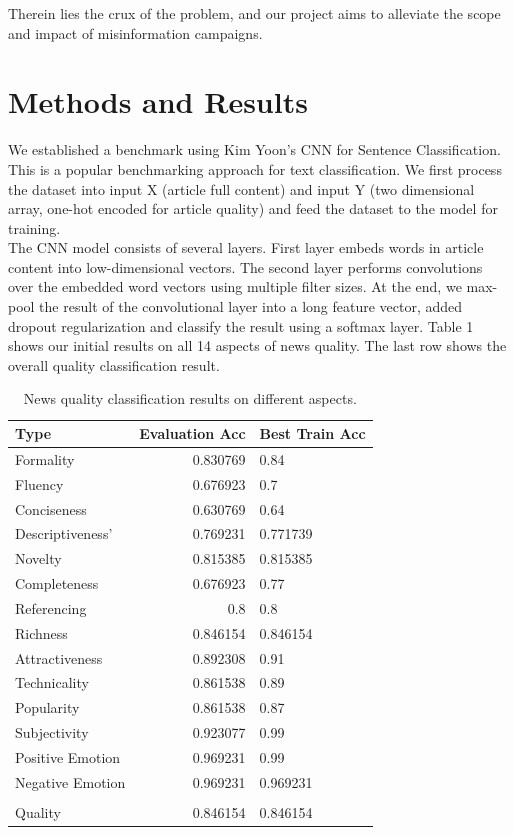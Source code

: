 \documentclass[11pt]{article}
\begin{document}
\indent Therein lies the crux of the problem, and our project aims to alleviate the scope and impact of misinformation campaigns.

\section{Methods and Results}

\indent \indent We established a benchmark using Kim Yoon’s CNN for Sentence Classification. This is a popular benchmarking approach for text classification. We first process the dataset into input X (article full content) and input Y (two dimensional array, one-hot encoded for article quality) and feed the dataset to the model for training. \\
\indent The CNN model consists of several layers. First layer embeds words in article content into low-dimensional vectors. The second layer performs convolutions over the embedded word vectors using multiple filter sizes. At the end, we max-pool the result of the convolutional layer into a long feature vector, added dropout regularization and classify the result using a softmax layer.  Table 1 shows our initial results on all 14 aspects of news quality. The last row shows the overall quality classification result.

\begin{table}[h]
\begin{center}
\begin{tabular}{|l|rl|}
\hline \bf Type & \bf Evaluation Acc & \bf Best Train Acc \\ \hline
Formality & 0.830769 & 0.84 \\
Fluency & 0.676923 & 0.7 \\
Conciseness & 0.630769 & 0.64 \\
Descriptiveness' & 0.769231 & 0.771739 \\
Novelty& 0.815385 & 0.815385 \\
Completeness & 0.676923  & 0.77\\
Referencing & 0.8 & 0.8 \\
Richness & 0.846154 & 0.846154 \\
Attractiveness & 0.892308 & 0.91 \\
Technicality & 0.861538 & 0.89 \\
Popularity & 0.861538 & 0.87 \\
Subjectivity & 0.923077 & 0.99 \\
Positive Emotion & 0.969231 & 0.99 \\
Negative Emotion & 0.969231 & 0.969231 \\
 &  &  \\
Quality & 0.846154 & 0.846154 \\
\hline
\end{tabular}
\end{center}
\caption{\label{font-table} News quality classification results on different aspects. }
\end{table}
\end{document}
